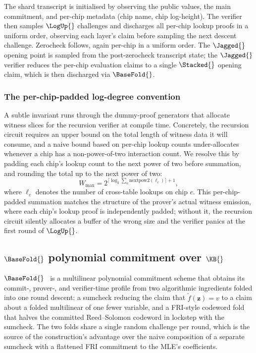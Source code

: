 The shard transcript is initialised by observing the public values, the main commitment, and per-chip metadata (chip name, chip log-height). The verifier then samples $\LogUp{}$ challenges and discharges all per-chip lookup proofs in a uniform order, observing each layer's claim before sampling the next descent challenge. Zerocheck follows, again per-chip in a uniform order. The $\Jagged{}$ opening point is sampled from the post-zerocheck transcript state; the $\Jagged{}$ verifier reduces the per-chip evaluation claims to a single $\Stacked{}$ opening claim, which is then discharged via $\BaseFold{}$.

\subsubsection{The per-chip-padded log-degree convention}

A subtle invariant runs through the dummy-proof generators that allocate witness slices for the recursion verifier at compile time. Concretely, the recursion circuit requires an upper bound on the total length of witness data it will consume, and a naive bound based on per-chip lookup counts under-allocates whenever a chip has a non-power-of-two interaction count. We resolve this by padding each chip's lookup count to the next power of two before summation, and rounding the total up to the next power of two:
\begin{equation}
  W_{\max} = 2^{\lceil \log_2 \sum_c \mathrm{nextpow2}(\ell_c) \rceil + 1},
\end{equation}
where $\ell_c$ denotes the number of cross-table lookups on chip $c$. This per-chip-padded summation matches the structure of the prover's actual witness emission, where each chip's lookup proof is independently padded; without it, the recursion circuit silently allocates a buffer of the wrong size and the verifier panics at the first round of $\LogUp{}$.

\subsection{$\BaseFold{}$ polynomial commitment over $\KB{}$}
\label{sec:basefold}

$\BaseFold{}$~\citep{basefold} is a multilinear polynomial commitment scheme that obtains its commit-, prover-, and verifier-time profile from two algorithmic ingredients folded into one round descent: a sumcheck reducing the claim that $\widetilde f(\bm z) = v$ to a claim about a folded multilinear of one fewer variable, and a FRI-style codeword fold that halves the committed Reed--Solomon codeword in lockstep with the sumcheck. The two folds share a single random challenge per round, which is the source of the construction's advantage over the naive composition of a separate sumcheck with a flattened FRI commitment to the MLE's coefficients.

